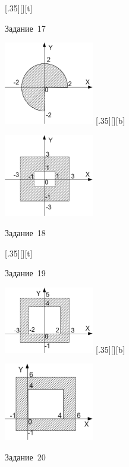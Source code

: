 \begin{figure}[H]
\begin{floatrow}
[.35\textwidth][\FBheight][t]
{\caption{Задание~17}
\label{ch03:refDrawing79}}
{\includegraphics[width=0.35\textwidth,keepaspectratio]{img/ris_3_80}}%
%
[.35\textwidth][\FBheight][b]
{\caption{Задание~18}
\label{ch03:refDrawing80}}
{\includegraphics[width=0.35\textwidth]{img/ris_3_81}}
\end{floatrow}
\end{figure}

\begin{figure}[H]
\begin{floatrow}
[.35\textwidth][\FBheight][t]
{\caption{Задание~19}
\label{ch03:refDrawing81}}
{\includegraphics[width=0.35\textwidth,keepaspectratio]{img/ris_3_82}}%
%
[.35\textwidth][\FBheight][b]
{\caption{Задание~20}
\label{ch03:refDrawing82}}
{\includegraphics[width=0.35\textwidth]{img/ris_3_83}}
\end{floatrow}
\end{figure}

